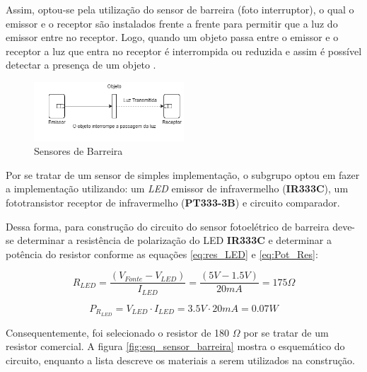     Assim, optou-se pela utilização do sensor de barreira (foto interruptor), o qual o emissor e o receptor são instalados frente a frente para permitir que a luz do emissor entre no receptor. Logo, quando um objeto passa entre o emissor e o receptor a luz que entra no receptor é interrompida ou reduzida e assim é possível detectar a presença de um objeto \cite{amron_photo_sensors}.
    
    \begin{figure}[H]
        \centering
        \includegraphics[width=0.5\textwidth]{figuras/sensor_infra.png}
        \caption{Sensores de Barreira}
        \label{fig:sensor_infra}
    \end{figure}
    
    Por se tratar de um sensor de simples implementação, o subgrupo optou em fazer a implementação utilizando: um \textit{LED} emissor de infravermelho (\textbf{IR333C}), um fototransistor receptor de infravermelho (\textbf{PT333-3B}) e circuito comparador.
    
    Dessa forma, para construção do circuito do sensor fotoelétrico de barreira deve-se determinar a resistência de polarização do LED \textbf{IR333C} e determinar a potência do resistor conforme as equações \ref{eq:res_LED} e \ref{eq:Pot_Res}:
    
    \begin{equation}
        R_{LED} = \frac{(V_{Fonte} - V_{LED})}{I_{LED}} = \frac{( 5 V - 1.5 V)}{20 mA} = 175 \Omega
        \label{eq:res_LED}
    \end{equation}
    
        \begin{equation}
        P_{R_{LED}} = V_{LED} \cdot I_{LED} = 3.5 V \cdot 20 mA = 0.07 W 
        \label{eq:Pot_Res}
    \end{equation}
    
    Consequentemente, foi selecionado o resistor de 180 $\Omega$ por se tratar de um resistor comercial. A figura \ref{fig:esq_sensor_barreira} mostra o esquemático do circuito, enquanto a lista descreve os materiais a serem utilizados na construção.
    
